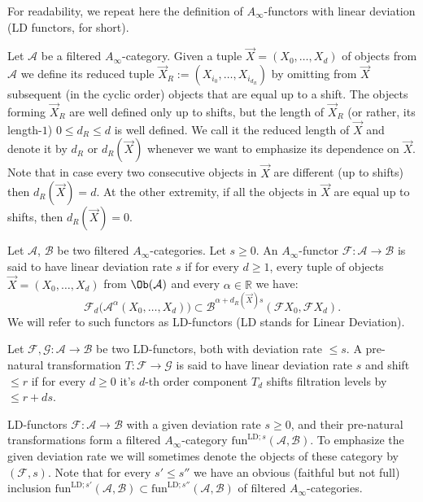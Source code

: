For readability, we repeat here the definition of
$A_{\infty}$-functors with linear deviation (LD functors, for short).

Let $\mathcal{A}$ be a filtered $A_{\infty}$-category.  Given a tuple
$\vec{X} = (X_0, \ldots, X_d)$ of objects from $\mathcal{A}$ we define
its reduced tuple $\vec{X}_R := (X_{i_0}, \ldots, X_{i_{d_R}})$ by
omitting from $\vec{X}$ subsequent (in the cyclic order) objects that
are equal up to a shift. The objects forming $\vec{X}_R$ are well
defined only up to shifts, but the length of $\vec{X}_R$ (or rather, its length-$1$)
$0 \leq d_R \leq d$ is well defined. We call it the reduced length of
$\vec{X}$ and denote it by $d_R$ or $d_R(\vec{X})$ whenever we want to
emphasize its dependence on $\vec{X}$. Note that in case every two
consecutive objects in $\vec{X}$ are different (up to shifts) then
$d_R(\vec{X}) = d$. At the other extremity, if all the objects in
$\vec{X}$ are equal up to shifts, then $d_R(\vec{X}) = 0$.

Let $\mathcal{A}$, $\mathcal{B}$ be two filtered
$A_{\infty}$-categories. Let $s\geq 0$. An $A_{\infty}$-functor
$\mathcal{F}: \mathcal{A} \longrightarrow \mathcal{B}$ is said to have
linear deviation rate $s$ if for every $d \geq 1$, every tuple
of objects $\vec{X} = (X_0, \ldots, X_d)$ from $\Ob(\mathcal{A})$ and
every $\alpha \in \mathbb{R}$ we have:
$$\mathcal{F}_d \bigl(\mathcal{A}^{\alpha}(X_0, \ldots, X_d)\bigr)
\subset \mathcal{B}^{\alpha + d_R(\vec{X}) s}(\mathcal{F}X_0,
\mathcal{F}X_d).$$ We will refer to such functors as LD-functors (LD
stands for Linear Deviation).

Let
$\mathcal{F}, \mathcal{G}: \mathcal{A} \longrightarrow \mathcal{B}$ be
two LD-functors, both with deviation rate $\leq s$.  A pre-natural
transformation $T: \mathcal{F} \longrightarrow \mathcal{G}$ is said to
have linear deviation rate $s$ and shift $\leq r$ if for every
$d \geq 0$ it's $d$-th order component $T_d$ shifts filtration levels
by $\leq r + ds$.

LD-functors $\mathcal{F}: \mathcal{A} \longrightarrow \mathcal{B}$
with a given deviation rate $s \geq 0$, and their pre-natural
transformations form a filtered $A_{\infty}$-category
$\text{fun}^{\text{LD};s}(\mathcal{A}, \mathcal{B})$. To emphasize the
given deviation rate we will sometimes denote the objects of these
category by $(\mathcal{F}, s)$. Note that for every $s' \leq s''$ we
have an obvious (faithful but not full) inclusion
$\text{fun}^{\text{LD};s'}(\mathcal{A}, \mathcal{B}) \subset
\text{fun}^{\text{LD};s''}(\mathcal{A}, \mathcal{B})$ of filtered
$A_{\infty}$-categories.

